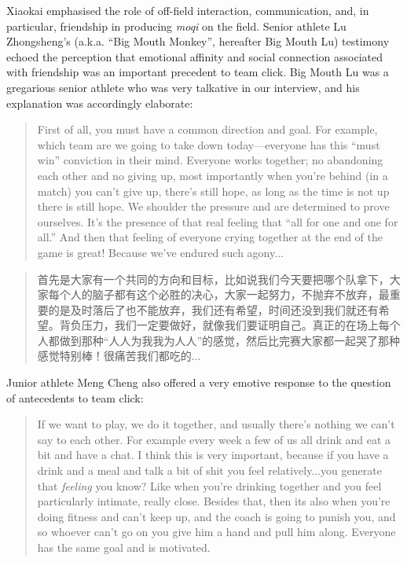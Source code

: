 \begin{CJK}{UTF8}{gbsn}
Xiaokai emphasised the role of off-field interaction, communication, and, in particular, friendship in producing \textit{moqi} on the field.  Senior athlete Lu Zhongsheng's (a.k.a. ``Big Mouth Monkey'', hereafter Big Mouth Lu) testimony echoed the perception that emotional affinity and social connection associated with friendship was an important precedent to team click. Big Mouth Lu was a gregarious senior athlete who was very talkative in our interview, and his explanation was accordingly elaborate:

    \begin{quote}
      First of all, you must have a common direction and goal.  For example, which team are we going to take down today---everyone has this ``must win'' conviction in their mind.  Everyone works together; no abandoning each other and no giving up, most importantly when you're behind (in a match) you can't give up, there's still hope, as long as the time is not up there is still hope.  We shoulder the pressure and are determined to prove ourselves.  It's the presence of that real feeling that ``all for one and one for all.''  And then that feeling of everyone crying together at the end of the game is great! Because we've endured such agony...
    \end{quote}

    \begin{quote}
      首先是大家有一个共同的方向和目标，比如说我们今天要把哪个队拿下，大家每个人的脑子都有这个必胜的决心，大家一起努力，不抛弃不放弃，最重要的是及时落后了也不能放弃，我们还有希望，时间还没到我们就还有希望。背负压力，我们一定要做好，就像我们要证明自己。真正的在场上每个人都做到那种“人人为我我为人人”的感觉，然后比完赛大家都一起哭了那种感觉特别棒！很痛苦我们都吃的...
    \end{quote}

Junior athlete Meng Cheng also offered a very emotive response to the question of antecedents to team click:

      \begin{quote}
        If we want to play, we do it together, and usually there's nothing we can't say to each other.  For example every week a few of us all drink and eat a bit and have a chat.  I think this is very important, because if you have a drink and a meal and talk a bit of shit you feel relatively...you generate that \textit{feeling} you know? Like when you're drinking together and you feel particularly intimate, really close.  Besides that, then its also when you're doing fitness and can't keep up, and the coach is going to punish you, and so whoever can't go on you give him a hand and pull him along.  Everyone has the same goal and is motivated.
      \end{quote}


\end{CJK}
